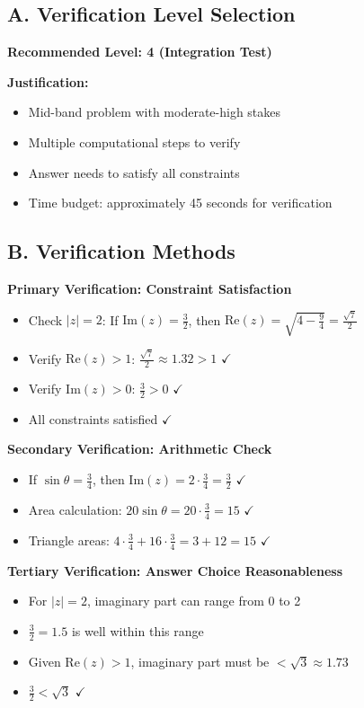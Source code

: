\documentclass[12pt]{article}
\begin{document}
\vspace{1em}

\begin{verificationbox}
\subsection*{A. Verification Level Selection}

\textbf{Recommended Level: 4 (Integration Test)}

\textbf{Justification:}
\begin{itemize}
    \item Mid-band problem with moderate-high stakes
    \item Multiple computational steps to verify
    \item Answer needs to satisfy all constraints
    \item Time budget: approximately 45 seconds for verification
\end{itemize}

\subsection*{B. Verification Methods}

\textbf{Primary Verification: Constraint Satisfaction}
\begin{itemize}
    \item Check $|z| = 2$: If $\text{Im}(z) = \frac{3}{2}$, then $\text{Re}(z) = \sqrt{4 - \frac{9}{4}} = \frac{\sqrt{7}}{2}$
    \item Verify $\text{Re}(z) > 1$: $\frac{\sqrt{7}}{2} \approx 1.32 > 1$ $\checkmark$
    \item Verify $\text{Im}(z) > 0$: $\frac{3}{2} > 0$ $\checkmark$
    \item All constraints satisfied $\checkmark$
\end{itemize}

\textbf{Secondary Verification: Arithmetic Check}
\begin{itemize}
    \item If $\sin\theta = \frac{3}{4}$, then $\text{Im}(z) = 2 \cdot \frac{3}{4} = \frac{3}{2}$ $\checkmark$
    \item Area calculation: $20\sin\theta = 20 \cdot \frac{3}{4} = 15$ $\checkmark$
    \item Triangle areas: $4 \cdot \frac{3}{4} + 16 \cdot \frac{3}{4} = 3 + 12 = 15$ $\checkmark$
\end{itemize}

\textbf{Tertiary Verification: Answer Choice Reasonableness}
\begin{itemize}
    \item For $|z| = 2$, imaginary part can range from 0 to 2
    \item $\frac{3}{2} = 1.5$ is well within this range
    \item Given $\text{Re}(z) > 1$, imaginary part must be $< \sqrt{3} \approx 1.73$
    \item $\frac{3}{2} < \sqrt{3}$ $\checkmark$
\end{itemize}


\end{verificationbox}
\end{document}
